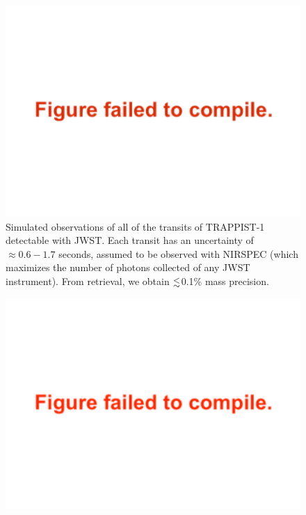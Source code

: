\documentclass[twocolumn]{aastex63}
\begin{document}
\begin{figure}
    \centering
    \includegraphics[width=\hsize]{figures/T1_JWST_all_transits_tight.png}
    {Simulated observations of all of the transits of TRAPPIST-1
        detectable with JWST.  Each transit has an
        uncertainty of ${\approx} 0.6-1.7   $ seconds, assumed to be observed with
        NIRSPEC (which maximizes the number of photons collected of any JWST
        instrument).  From retrieval, we obtain
        ${\lesssim}$0.1\% mass precision.}
    \label{fig:JWST_all_the_transits}
\end{figure}

\begin{figure}
    \centering
    \includegraphics[width=\hsize]{figures/Recovered_masses_JWST_5yr_all_transits_NIRSPEC.pdf}
    \label{fig:JWST_all_mass}
\end{figure}
\end{document}
